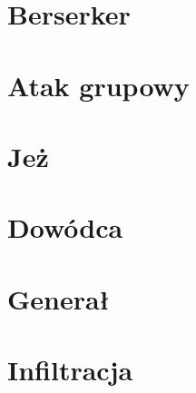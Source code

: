 \section{Berserker}  \label{sec:link_uw_berserker}

\section{Atak grupowy}  \label{sec:link_uw_atak_grupowe}

\section{Jeż}  \label{sec:link_uw_jez}

\section{Dowódca}  \label{sec:link_uw_dowdoca}

\section{Generał}  \label{sec:link_uw_general}

\section{Infiltracja}  \label{sec:link_uw_inflirtacja}
